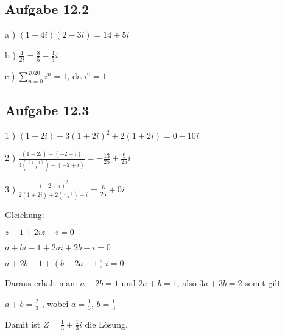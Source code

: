 \documentclass{standalone}
\begin{document}
\subsection{Aufgabe 12.2}

	
a ) $ (1 + 4i ) (2- 3i ) = 14 + 5 i $

b ) $\frac{4}{2i} = \frac{8}{5} - \frac{4}{5} i $

c ) $\sum\limits_{n=0}^{2020} i^n = 1 $, da $i^0 = 1 $


\subsection{Aufgabe 12.3}

1 ) $ (1 + 2i) + 3 (1 + 2i)^2 + 2 (1 + 2i) = 0 - 10i $ 
	
	2 ) $ \frac{(1+2i)+(-2+i)}{4(\frac{(1-i)}{2}) - (-2+i)} = - \frac{13}{25} + \frac{9}{25}i $ 
	
	3 ) $ \frac{(-2+i)^2}{2(1+2i)+2(\frac{1-i}{2})+i} = \frac{6}{25}+0i$
	
	
	Gleichung: 
	
	
	$z-1+2iz-i=0$ 
	
	$ a+bi-1+2ai+2b-i=0$
	
	$ a+2b-1+(b+2a-1)i=0 $
	
	Daraus erhält man: $ a+2b=1 $ und $2a+b=1$, also $ 3a+3b=2 $ somit gilt 
	
	$ a+b=\frac{2}{3}$ , wobei $a=\frac{1}{3}$, $b=\frac{1}{3}$	
	
	Damit ist $ Z=\frac{1}{3}+\frac{1}{3}i$ die Lösung. 
\end{document}
